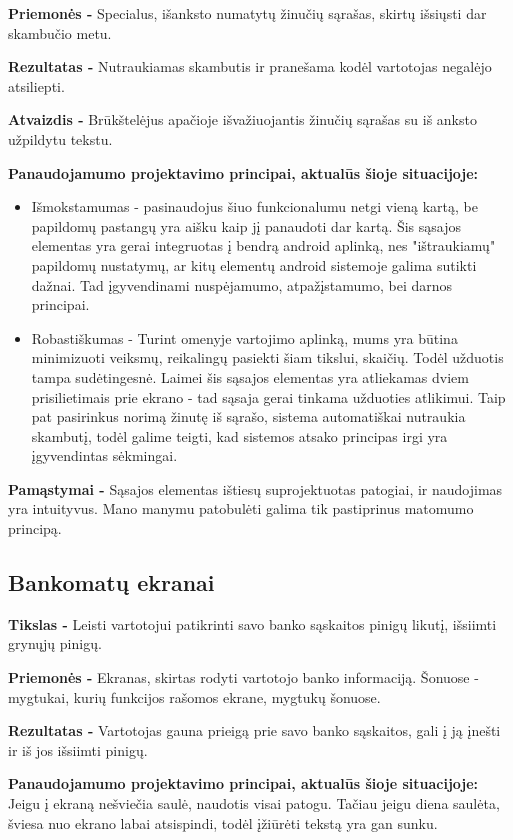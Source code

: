 ﻿\documentclass[a4paper, 12pt]{article}
\begin{document}
		\textbf{Priemonės -}
		Specialus, išanksto numatytų žinučių sąrašas, skirtų išsiųsti dar skambučio metu.

		\textbf{Rezultatas -}
		Nutraukiamas skambutis ir pranešama kodėl vartotojas negalėjo atsiliepti.

		\textbf{Atvaizdis -}
		Brūkštelėjus apačioje išvažiuojantis žinučių sąrašas su iš anksto užpildytu tekstu.

		\textbf{Panaudojamumo projektavimo principai, aktualūs šioje situacijoje:}
		\begin{itemize}
		\item Išmokstamumas - pasinaudojus šiuo funkcionalumu netgi vieną kartą, be papildomų pastangų yra aišku kaip jį panaudoti dar kartą.
		Šis sąsajos elementas yra gerai integruotas į bendrą android aplinką, nes "ištraukiamų" papildomų nustatymų, ar kitų elementų android sistemoje galima sutikti dažnai.
		Tad įgyvendinami nuspėjamumo, atpažįstamumo, bei darnos principai.
		\item Robastiškumas - Turint omenyje vartojimo aplinką, mums yra būtina minimizuoti veiksmų, reikalingų pasiekti šiam tikslui, skaičių.
		Todėl užduotis tampa sudėtingesnė.
		Laimei šis sąsajos elementas yra atliekamas dviem prisilietimais prie ekrano - tad sąsaja gerai tinkama užduoties atlikimui.
		Taip pat pasirinkus norimą žinutę iš sąrašo, sistema automatiškai nutraukia skambutį, todėl galime teigti, kad sistemos atsako principas irgi yra įgyvendintas sėkmingai.
		\end{itemize}

		\textbf{Pamąstymai -}
		Sąsajos elementas ištiesų suprojektuotas patogiai, ir naudojimas yra intuityvus.
		Mano manymu patobulėti galima tik pastiprinus matomumo principą. 
	
	\subsection{Bankomatų ekranai}
		\textbf{Tikslas -}
		Leisti vartotojui patikrinti savo banko sąskaitos pinigų likutį, išsiimti grynųjų pinigų.

		\textbf{Priemonės -}
		Ekranas, skirtas rodyti vartotojo banko informaciją.
		Šonuose - mygtukai, kurių funkcijos rašomos ekrane, mygtukų šonuose.

		\textbf{Rezultatas -}
		Vartotojas gauna prieigą prie savo banko sąskaitos, gali į ją įnešti ir iš jos išsiimti pinigų.

		\textbf{Panaudojamumo projektavimo principai, aktualūs šioje situacijoje:}\\
		Jeigu į ekraną nešviečia saulė, naudotis visai patogu.
		Tačiau jeigu diena saulėta, šviesa nuo ekrano labai atsispindi, todėl įžiūrėti tekstą yra gan sunku.
\end{document}
